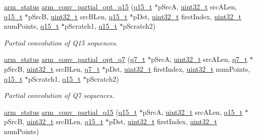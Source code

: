\begin{DoxyCompactItemize}
\hyperlink{arm__math_8h_a5e459c6409dfcd2927bb8a57491d7cf6}{arm\-\_\-status} \hyperlink{group___partial_conv_ga834b23b4ade8682beeb55778399101f8}{arm\-\_\-conv\-\_\-partial\-\_\-opt\-\_\-q15} (\hyperlink{arm__math_8h_ab5a8fb21a5b3b983d5f54f31614052ea}{q15\-\_\-t} $\ast$p\-Src\-A, \hyperlink{stdint_8h_a435d1572bf3f880d55459d9805097f62}{uint32\-\_\-t} src\-A\-Len, \hyperlink{arm__math_8h_ab5a8fb21a5b3b983d5f54f31614052ea}{q15\-\_\-t} $\ast$p\-Src\-B, \hyperlink{stdint_8h_a435d1572bf3f880d55459d9805097f62}{uint32\-\_\-t} src\-B\-Len, \hyperlink{arm__math_8h_ab5a8fb21a5b3b983d5f54f31614052ea}{q15\-\_\-t} $\ast$p\-Dst, \hyperlink{stdint_8h_a435d1572bf3f880d55459d9805097f62}{uint32\-\_\-t} first\-Index, \hyperlink{stdint_8h_a435d1572bf3f880d55459d9805097f62}{uint32\-\_\-t} num\-Points, \hyperlink{arm__math_8h_ab5a8fb21a5b3b983d5f54f31614052ea}{q15\-\_\-t} $\ast$p\-Scratch1, \hyperlink{arm__math_8h_ab5a8fb21a5b3b983d5f54f31614052ea}{q15\-\_\-t} $\ast$p\-Scratch2)
\begin{DoxyCompactList}\small\item\em Partial convolution of Q15 sequences. \end{DoxyCompactList}\item 
\hyperlink{arm__math_8h_a5e459c6409dfcd2927bb8a57491d7cf6}{arm\-\_\-status} \hyperlink{group___partial_conv_ga3707e16af1435b215840006a7ab0c98f}{arm\-\_\-conv\-\_\-partial\-\_\-opt\-\_\-q7} (\hyperlink{arm__math_8h_ae541b6f232c305361e9b416fc9eed263}{q7\-\_\-t} $\ast$p\-Src\-A, \hyperlink{stdint_8h_a435d1572bf3f880d55459d9805097f62}{uint32\-\_\-t} src\-A\-Len, \hyperlink{arm__math_8h_ae541b6f232c305361e9b416fc9eed263}{q7\-\_\-t} $\ast$p\-Src\-B, \hyperlink{stdint_8h_a435d1572bf3f880d55459d9805097f62}{uint32\-\_\-t} src\-B\-Len, \hyperlink{arm__math_8h_ae541b6f232c305361e9b416fc9eed263}{q7\-\_\-t} $\ast$p\-Dst, \hyperlink{stdint_8h_a435d1572bf3f880d55459d9805097f62}{uint32\-\_\-t} first\-Index, \hyperlink{stdint_8h_a435d1572bf3f880d55459d9805097f62}{uint32\-\_\-t} num\-Points, \hyperlink{arm__math_8h_ab5a8fb21a5b3b983d5f54f31614052ea}{q15\-\_\-t} $\ast$p\-Scratch1, \hyperlink{arm__math_8h_ab5a8fb21a5b3b983d5f54f31614052ea}{q15\-\_\-t} $\ast$p\-Scratch2)
\begin{DoxyCompactList}\small\item\em Partial convolution of Q7 sequences. \end{DoxyCompactList}\item 
\hyperlink{arm__math_8h_a5e459c6409dfcd2927bb8a57491d7cf6}{arm\-\_\-status} \hyperlink{group___partial_conv_ga209a2a913a0c5e5679c5988da8f46b03}{arm\-\_\-conv\-\_\-partial\-\_\-q15} (\hyperlink{arm__math_8h_ab5a8fb21a5b3b983d5f54f31614052ea}{q15\-\_\-t} $\ast$p\-Src\-A, \hyperlink{stdint_8h_a435d1572bf3f880d55459d9805097f62}{uint32\-\_\-t} src\-A\-Len, \hyperlink{arm__math_8h_ab5a8fb21a5b3b983d5f54f31614052ea}{q15\-\_\-t} $\ast$p\-Src\-B, \hyperlink{stdint_8h_a435d1572bf3f880d55459d9805097f62}{uint32\-\_\-t} src\-B\-Len, \hyperlink{arm__math_8h_ab5a8fb21a5b3b983d5f54f31614052ea}{q15\-\_\-t} $\ast$p\-Dst, \hyperlink{stdint_8h_a435d1572bf3f880d55459d9805097f62}{uint32\-\_\-t} first\-Index, \hyperlink{stdint_8h_a435d1572bf3f880d55459d9805097f62}{uint32\-\_\-t} num\-Points)

\end{DoxyCompactItemize}
